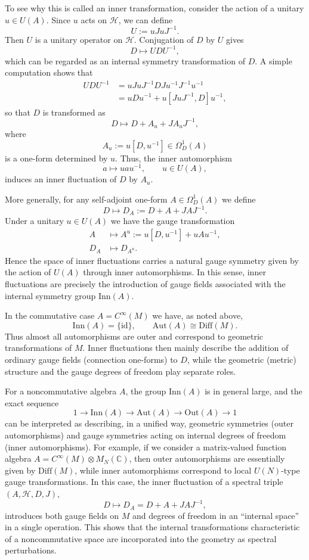 \documentclass[12pt]{article}
\theoremstyle{definition} %
\theoremstyle{plain} %
\theoremstyle{remark} %
\theoremstyle{underline}
\begin{document}
To see why this is called an inner transformation, consider the action of a
unitary $u\in U(A)$.
Since $u$ acts on $\mathcal{H}$, we can define
\[
  U := u J u J^{-1}.
\]
Then $U$ is a unitary operator on $\mathcal{H}$.
Conjugation of $D$ by $U$ gives
\[
  D \longmapsto U D U^{-1},
\]
which can be regarded as an internal symmetry transformation of $D$.
A simple computation shows that
\begin{align*}
  U D U^{-1}
  &= u J u J^{-1} D J u^{-1} J^{-1} u^{-1} \\
  &= u D u^{-1}
     + u [J u J^{-1}, D] u^{-1},
\end{align*}
so that $D$ is transformed as
\[
  D \longmapsto D + A_u + J A_u J^{-1},
\]
where
\[
  A_u := u [D,u^{-1}] \in \Omega^1_D(A)
\]
is a one-form determined by $u$.
Thus, the inner automorphism
\[
  a \longmapsto u a u^{-1}, \qquad u\in U(A),
\]
induces an inner fluctuation of $D$ by $A_u$.

More generally, for any self-adjoint one-form $A\in\Omega^1_D(A)$ we define
\[
  D \longmapsto D_A := D + A + JAJ^{-1}.
\]
Under a unitary $u\in U(A)$ we have the gauge transformation
\begin{align*}
  A &\longmapsto A^u
    := u [D,u^{-1}] + u A u^{-1}, \\
  D_A &\longmapsto D_{A^u}.
\end{align*}
Hence the space of inner fluctuations carries a natural gauge symmetry given by
the action of $U(A)$ through inner automorphisms.
In this sense, inner fluctuations are precisely the introduction of gauge fields
associated with the internal symmetry group $\mathrm{Inn}(A)$.

In the commutative case $A = C^\infty(M)$ we have, as noted above,
\[
  \mathrm{Inn}(A) = \{ \mathrm{id} \},\qquad
  \mathrm{Aut}(A) \cong \mathrm{Diff}(M).
\]
Thus almost all automorphisms are outer and correspond to geometric
transformations of $M$.
Inner fluctuations then mainly describe the addition of ordinary gauge fields
(connection one-forms) to $D$, while the geometric (metric) structure and the
gauge degrees of freedom play separate roles.

For a noncommutative algebra $A$, the group $\mathrm{Inn}(A)$ is in general
large, and the exact sequence
\[
  1 \longrightarrow \mathrm{Inn}(A)
    \longrightarrow \mathrm{Aut}(A)
    \longrightarrow \mathrm{Out}(A)
    \longrightarrow 1
\]
can be interpreted as describing, in a unified way, geometric symmetries (outer
automorphisms) and gauge symmetries acting on internal degrees of freedom
(inner automorphisms).
For example, if we consider a matrix-valued function algebra
$A=C^\infty(M)\otimes M_N(\mathbb{C})$, then outer automorphisms are essentially
given by $\mathrm{Diff}(M)$, while inner automorphisms correspond to local
$U(N)$-type gauge transformations.
In this case, the inner fluctuation of a spectral triple $(A,\mathcal{H},D,J)$,
\[
  D \longmapsto D_A = D + A + JAJ^{-1},
\]
introduces both gauge fields on $M$ and degrees of freedom in an “internal
space” in a single operation.
This shows that the internal transformations characteristic of a noncommutative
space are incorporated into the geometry as spectral perturbations.
\end{document}
